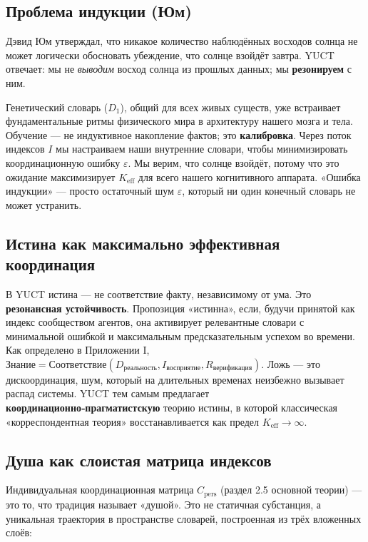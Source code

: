\documentclass[12pt,a4paper]{article}
\begin{document}
	\subsection{Проблема индукции (Юм)}
	
	Дэвид Юм утверждал, что никакое количество наблюдённых восходов солнца не может логически обосновать убеждение, что солнце взойдёт завтра. YUCT отвечает: мы не \emph{выводим} восход солнца из прошлых данных; мы \textbf{резонируем} с ним.
	
	Генетический словарь (\(D_1\)), общий для всех живых существ, уже встраивает фундаментальные ритмы физического мира в архитектуру нашего мозга и тела. Обучение — не индуктивное накопление фактов; это \textbf{калибровка}. Через поток индексов \(I\) мы настраиваем наши внутренние словари, чтобы минимизировать координационную ошибку \(\varepsilon\). Мы верим, что солнце взойдёт, потому что это ожидание максимизирует \(K_{\mathrm{eff}}\) для всего нашего когнитивного аппарата. «Ошибка индукции» — просто остаточный шум \(\varepsilon\), который ни один конечный словарь не может устранить.
	
	\subsection{Истина как максимально эффективная координация}
	
	В YUCT истина — не соответствие факту, независимому от ума. Это \textbf{резонансная устойчивость}. Пропозиция «истинна», если, будучи принятой как индекс сообществом агентов, она активирует релевантные словари с минимальной ошибкой и максимальным предсказательным успехом во времени. Как определено в Приложении I, \(\text{Знание} = \text{Соответствие}(D_{\text{реальность}}, I_{\text{восприятие}}, R_{\text{верификация}})\). Ложь — это дискоординация, шум, который на длительных временах неизбежно вызывает распад системы. YUCT тем самым предлагает \textbf{координационно‑прагматистскую} теорию истины, в которой классическая «корреспондентная теория» восстанавливается как предел \(K_{\mathrm{eff}} \to \infty\).
	
	\subsection{Душа как слоистая матрица индексов}
	
	Индивидуальная координационная матрица \(C_{\mathrm{pers}}\) (раздел 2.5 основной теории) — это то, что традиция называет «душой». Это не статичная субстанция, а уникальная траектория в пространстве словарей, построенная из трёх вложенных слоёв:
	
\end{document}
